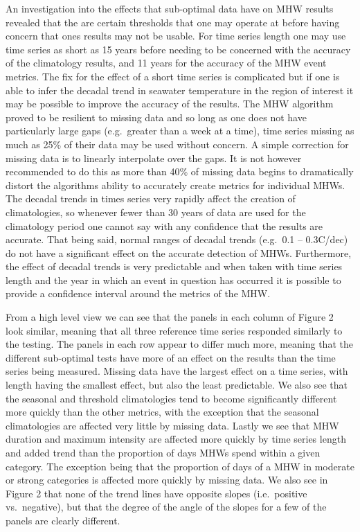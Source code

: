 \documentclass[]{article}
\begin{document}
An investigation into the effects that sub-optimal data have on MHW
results revealed that the are certain thresholds that one may operate at
before having concern that ones results may not be usable. For time
series length one may use time series as short as 15 years before
needing to be concerned with the accuracy of the climatology results,
and 11 years for the accuracy of the MHW event metrics. The fix for the
effect of a short time series is complicated but if one is able to infer
the decadal trend in seawater temperature in the region of interest it
may be possible to improve the accuracy of the results. The MHW
algorithm proved to be resilient to missing data and so long as one does
not have particularly large gaps (e.g.~greater than a week at a time),
time series missing as much as 25\% of their data may be used without
concern. A simple correction for missing data is to linearly interpolate
over the gaps. It is not however recommended to do this as more than
40\% of missing data begins to dramatically distort the algorithms
ability to accurately create metrics for individual MHWs. The decadal
trends in times series very rapidly affect the creation of
climatologies, so whenever fewer than 30 years of data are used for the
climatology period one cannot say with any confidence that the results
are accurate. That being said, normal ranges of decadal trends (e.g.~0.1
-- 0.3C/dec) do not have a significant effect on the accurate detection
of MHWs. Furthermore, the effect of decadal trends is very predictable
and when taken with time series length and the year in which an event in
question has occurred it is possible to provide a confidence interval
around the metrics of the MHW.

From a high level view we can see that the panels in each column of
Figure 2 look similar, meaning that all three reference time series
responded similarly to the testing. The panels in each row appear to
differ much more, meaning that the different sub-optimal tests have more
of an effect on the results than the time series being measured. Missing
data have the largest effect on a time series, with length having the
smallest effect, but also the least predictable. We also see that the
seasonal and threshold climatologies tend to become significantly
different more quickly than the other metrics, with the exception that
the seasonal climatologies are affected very little by missing data.
Lastly we see that MHW duration and maximum intensity are affected more
quickly by time series length and added trend than the proportion of
days MHWs spend within a given category. The exception being that the
proportion of days of a MHW in moderate or strong categories is affected
more quickly by missing data. We also see in Figure 2 that none of the
trend lines have opposite slopes (i.e.~positive vs.~negative), but that
the degree of the angle of the slopes for a few of the panels are
clearly different.
\end{document}
